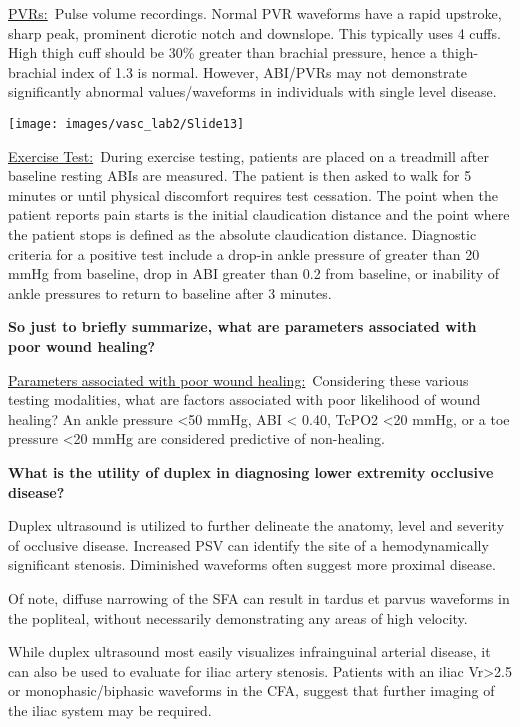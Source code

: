 \documentclass[
]{book}
\begin{document}
\uline{PVRs:}~Pulse volume recordings. Normal PVR waveforms have a
rapid upstroke, sharp peak, prominent dicrotic notch and downslope. This
typically uses 4 cuffs. High thigh cuff should be 30\% greater than
brachial pressure, hence a thigh-brachial index of 1.3 is normal.
However, ABI/PVRs may not demonstrate significantly abnormal
values/waveforms in individuals with single level disease.

\texttt{[image: images/vasc\_lab2/Slide13]}

\uline{Exercise Test:}~During exercise testing, patients are
placed on a treadmill after baseline resting ABIs are measured. The
patient is then asked to walk for 5 minutes or until physical discomfort
requires test cessation. The point when the patient reports pain starts
is the initial claudication distance and the point where the patient
stops is defined as the absolute claudication distance. Diagnostic
criteria for a positive test include a drop-in ankle pressure of greater
than 20 mmHg from baseline, drop in ABI greater than 0.2 from baseline,
or inability of ankle pressures to return to baseline after 3
minutes.\citep{strandness1964}

\textbf{So just to briefly summarize, what are parameters associated with poor
wound healing?}

\uline{Parameters associated with poor wound healing:}~Considering
these various testing modalities, what are factors associated with poor
likelihood of wound healing? An ankle pressure \textless50 mmHg, ABI \textless{} 0.40,
TcPO2 \textless20 mmHg, or a toe pressure \textless20 mmHg are considered predictive
of non-healing.

\textbf{What is the utility of duplex in diagnosing lower extremity occlusive
disease?}

Duplex ultrasound is utilized to further delineate the anatomy, level
and severity of occlusive disease. Increased PSV can identify the site
of a hemodynamically significant stenosis. Diminished waveforms often
suggest more proximal disease.

Of note, diffuse narrowing of the SFA can result in tardus et parvus
waveforms in the popliteal, without necessarily demonstrating any areas
of high velocity.\citep{aburahma2022, pellerito2019}

While duplex ultrasound most easily visualizes infrainguinal arterial
disease, it can also be used to evaluate for iliac artery stenosis.
Patients with an iliac Vr\textgreater2.5 or monophasic/biphasic waveforms in the
CFA, suggest that further imaging of the iliac system may be
required.\citep{heinen2018}
\end{document}
